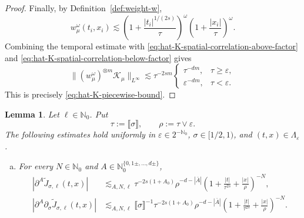 \documentclass{article}
\numberwithin{equation}{section}
\newcommand{\assign}{:=}
\theoremstyle{plain}
\newtheorem{lemma}[theorem]{Lemma}
\theoremstyle{definition}
\begin{document}
\begin{proof}
	Finally, by Definition~\ref{def:weight-w},
	\[
	w_\mu^\omega(t_i,x_i)
	\lesssim
	\left(
	1+\frac{|t_i|^{1/(2s)}}{\tau}
	\right)^\omega
	\left(
	1+\frac{|x_i|}{\tau}
	\right)^\omega.
	\]
	Combining the temporal estimate with
	\eqref{eq:hat-K-spatial-correlation-above-factor} and
	\eqref{eq:hat-K-spatial-correlation-below-factor} gives
	\[
	\|
	(w_\mu^\omega)^{\otimes m}\mathcal K_\mu
	\|_{L^\infty}
	\lesssim
	\tau^{-2sm}
	\begin{cases}
		\tau^{-dm},&\tau\geq\varepsilon,\\
		\varepsilon^{-dm},&\tau<\varepsilon.
	\end{cases}
	\]
	This is precisely \eqref{eq:hat-K-piecewise-bound}.
\end{proof}


\begin{lemma}
	\label{lem:J-decay}
	Let $\ell\in\mathbb N_0$. Put
	\[
	\tau
	\assign \llbracket\sigma\rrbracket,
	\qquad
	\rho
	\assign \tau\vee\varepsilon.
	\]
	The following estimates hold uniformly in
	\(\varepsilon\in2^{-\mathbb N_0}\),
	\(\sigma\in[1/2,1)\), and \((t,x)\in\Lambda_\varepsilon\).
	
	\begin{enumerate}[(a)]
		\item For every \(N\in\mathbb N_0\) and
		\(A\in\mathbb N_0^{\{0,1\pm,\ldots,d\pm\}}\),
		\begin{align}
			|\partial^A\tilde J_{\sigma,\ell}(t,x)|
			&\lesssim_{A,N,\ell}
			\tau^{-2s(1+A_0)}
			\rho^{-d-|\bar A|}
			\left(1+\frac{|t|}{\tau^{2s}}+\frac{|x|}{\rho}\right)^{-N},
			\label{eq:J-decay-corrected-pointwise}
			\\
			|\partial^A\partial_\sigma
			\tilde J_{\sigma,\ell}(t,x)|
			&\lesssim_{A,N,\ell}
			\llbracket\sigma\rrbracket^{-1}
			\tau^{-2s(1+A_0)}
			\rho^{-d-|\bar A|}
			\left(1+\frac{|t|}{\tau^{2s}}+\frac{|x|}{\rho}\right)^{-N}.
			\label{eq:J-decay-corrected-sigma}
		\end{align}
		

\end{enumerate}
\end{lemma}
\end{document}
